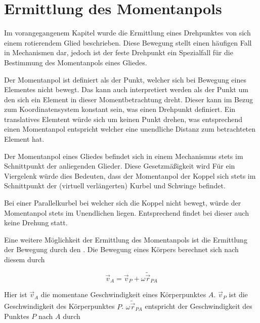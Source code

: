 \chapter{Ermittlung des Momentanpols}\label{ch:ermittlung_momentanpol}


Im vorangegangenem Kapitel wurde die Ermittlung eines Drehpunktes von sich einem rotierendem Glied beschrieben.
Diese Bewegung stellt einen häufigen Fall in Mechanismen dar, jedoch ist der feste Drehpunkt ein Spezialfall für die Bestimmung des Momentanpols eines Gliedes.

Der Momentanpol ist definiert als der Punkt, welcher sich bei Bewegung eines Elementes nicht bewegt.
Das kann auch interpretiert werden als der Punkt um den sich ein Element in dieser Momentbetrachtung dreht.
Dieser kann im Bezug zum Koordinatensystem konstant sein, was einen Drehpunkt definiert.
Ein translatives Elemtent würde sich um keinen Punkt drehen, was entsprechend einen Momentanpol entspricht welcher eine unendliche Distanz zum betrachteten Element hat.

Der Momentanpol eines Gliedes befindet sich in einem Mechanismus stets im Schnittpunkt der anliegenden Glieder.
Diese Gesetzmäßigkeit wird  %
Für ein Viergelenk würde dies Bedeuten, dass der Momentanpol der Koppel sich stets im Schnittpunkt der (virtuell verlängerten) Kurbel und Schwinge befindet.

Bei einer Parallelkurbel bei welcher sich die Koppel nicht bewegt, würde der Momentanpol stets im Unendlichen liegen.
Entsprechend findet bei dieser auch keine Drehung statt.

Eine weitere Möglichkeit der Ermittlung des Momentanpols ist die Ermittlung der Bewegung durch den . %
Die Bewegung eines Körpers berechnet sich nach diesem durch

\begin{equation}
    \vec{v}_A = \vec{v}_P + \omega \tilde{\vec{r}}_{PA}
    \label{eq:satz_von_euler}
\end{equation} 

Hier ist $\vec{v}_A$ die momentane Geschwindigkeit eines Körperpunktes $A$.
$\vec{v}_P$ ist die Geschwindigkeit des Körperpunktes $P$.
$\omega\tilde{\vec{r}}_{PA}$ entspricht der Geschwindigkeit des Punktes $P$ nach $A$ durch %

